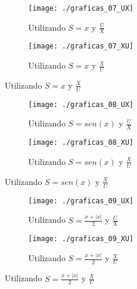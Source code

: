 \documentclass[12pt,spanish,lettersize]{article}
\begin{document}
\begin{figure}[h]
\begin{subfigure}{0.45\textwidth}
\texttt{[image: ./graficas\_07\_UX]}
\caption{Utilizando $S=x$ y $\frac{U}{X}$}
\end{subfigure}
\begin{subfigure}{0.45\textwidth}
\texttt{[image: ./graficas\_07\_XU]}
\caption{Utilizando $S=x$ y $\frac{X}{U}$}
\end{subfigure}
\end{figure}
\begin{figure}[h]
\begin{subfigure}{0.45\textwidth}
\texttt{[image: ./graficas\_08\_UX]}
\caption{Utilizando $S=sen(x)$ y $\frac{U}{X}$}
\end{subfigure}
\begin{subfigure}{0.45\textwidth}
\texttt{[image: ./graficas\_08\_XU]}
\caption{Utilizando $S=sen(x)$ y $\frac{X}{U}$}
\end{subfigure}
\end{figure}
\begin{figure}[h]
\begin{subfigure}{0.45\textwidth}
\texttt{[image: ./graficas\_09\_UX]}
\caption{Utilizando $S=\frac{x+|x|}{2}$ y $\frac{U}{X}$}
\end{subfigure}
\begin{subfigure}{0.45\textwidth}
\texttt{[image: ./graficas\_09\_XU]}
\caption{Utilizando $S=\frac{x+|x|}{2}$ y $\frac{X}{U}$}
\end{subfigure}
\end{figure}
\end{document}
